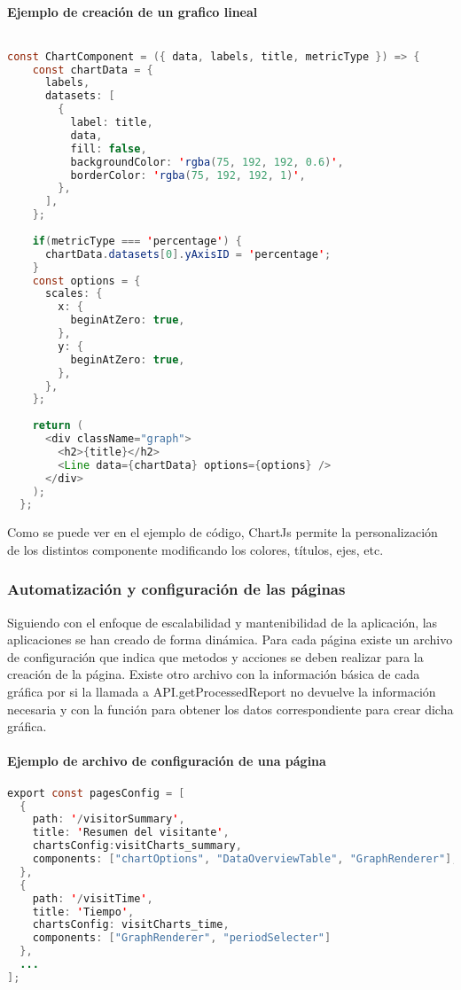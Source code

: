 \paragraph{Ejemplo de creación de un grafico lineal}
\begin{lstlisting}[language=Java]
    
const ChartComponent = ({ data, labels, title, metricType }) => {
    const chartData = {
      labels,
      datasets: [
        {
          label: title,
          data,
          fill: false,
          backgroundColor: 'rgba(75, 192, 192, 0.6)',
          borderColor: 'rgba(75, 192, 192, 1)',
        },
      ],
    };
  
    if(metricType === 'percentage') {
      chartData.datasets[0].yAxisID = 'percentage';
    }
    const options = {
      scales: {
        x: {
          beginAtZero: true,
        },
        y: {
          beginAtZero: true,
        },
      },
    };
  
    return (
      <div className="graph">
        <h2>{title}</h2>
        <Line data={chartData} options={options} />
      </div>
    );
  };
\end{lstlisting}

Como se puede ver en el ejemplo de código, ChartJs permite la personalización de los distintos componente modificando los colores, 
títulos, ejes, etc. 

\subsubsection{Automatización y configuración de las páginas}
\label{sec:automatizacion-configuracion-paginas}

Siguiendo con el enfoque de escalabilidad y mantenibilidad de la aplicación, las aplicaciones se han creado de forma dinámica.
Para cada página existe un archivo de configuración que indica que metodos y acciones se deben realizar para la creación de la
página. Existe otro archivo con la información básica de cada gráfica por si la llamada a API.getProcessedReport no devuelve la
información necesaria y con la función para obtener los datos correspondiente para crear dicha gráfica. 

\paragraph{Ejemplo de archivo de configuración de una página}

\begin{lstlisting}[language=Java]
    export const pagesConfig = [
  {
    path: '/visitorSummary',
    title: 'Resumen del visitante',
    chartsConfig:visitCharts_summary,
    components: ["chartOptions", "DataOverviewTable", "GraphRenderer"],
  },
  {
    path: '/visitTime',
    title: 'Tiempo',
    chartsConfig: visitCharts_time,
    components: ["GraphRenderer", "periodSelecter"]
  },
  ...
];
\end{lstlisting}

